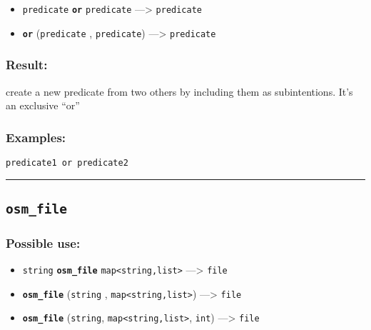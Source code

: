 \documentclass[]{book}
\providecommand{\tightlist}{%
  \setlength{\itemsep}{0pt}\setlength{\parskip}{0pt}}
\theoremstyle{definition}
\theoremstyle{definition}
\theoremstyle{definition}
\theoremstyle{remark}
\begin{document}
\begin{itemize}
\tightlist
\item
  \texttt{predicate} \textbf{\texttt{or}} \texttt{predicate}
  ---\textgreater{} \texttt{predicate}
\item
  \textbf{\texttt{or}} (\texttt{predicate} , \texttt{predicate})
  ---\textgreater{} \texttt{predicate}
\end{itemize}

\subsubsection{Result:}\label{result-372}

create a new predicate from two others by including them as
subintentions. It's an exclusive ``or''

\subsubsection{Examples:}\label{examples-264}

\begin{verbatim}
predicate1 or predicate2 
\end{verbatim}

\begin{center}\rule{0.5\linewidth}{\linethickness}\end{center}

\subsection{\texorpdfstring{\texttt{osm\_file}}{osm\_file}}\label{osm_file}

\subsubsection{Possible use:}\label{possible-use-387}

\begin{itemize}
\tightlist
\item
  \texttt{string} \textbf{\texttt{osm\_file}}
  \texttt{map\textless{}string,list\textgreater{}} ---\textgreater{}
  \texttt{file}
\item
  \textbf{\texttt{osm\_file}} (\texttt{string} ,
  \texttt{map\textless{}string,list\textgreater{}}) ---\textgreater{}
  \texttt{file}
\item
  \textbf{\texttt{osm\_file}} (\texttt{string},
  \texttt{map\textless{}string,list\textgreater{}}, \texttt{int})
  ---\textgreater{} \texttt{file}
\end{itemize}
\end{document}
